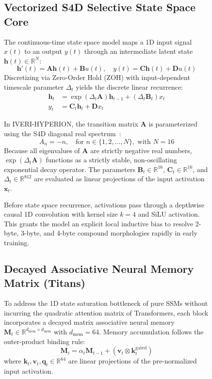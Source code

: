 \documentclass[10pt,twocolumn,letterpaper]{article}
\begin{document}
\begin{figure}[t]
\subsection{Vectorized S4D Selective State Space Core}
The continuous-time state space model maps a 1D input signal $x(t)$ to an output $y(t)$ through an intermediate latent state $\mathbf{h}(t) \in \mathbb{R}^N$:
\begin{equation}
    \mathbf{h}'(t) = \mathbf{A}\mathbf{h}(t) + \mathbf{B}u(t), \quad y(t) = \mathbf{C}\mathbf{h}(t) + \mathbf{D}u(t)
\end{equation}
Discretizing via Zero-Order Hold (ZOH) with input-dependent timescale parameter $\Delta_t$ yields the discrete linear recurrence:
\begin{align}
    \mathbf{h}_t &= \exp(\Delta_t \mathbf{A})\mathbf{h}_{t-1} + (\Delta_t \mathbf{B}_t) x_t \\
    y_t &= \mathbf{C}_t \mathbf{h}_t + \mathbf{D} x_t
\end{align}

In IVERI-HYPERION, the transition matrix $\mathbf{A}$ is parameterized using the S4D diagonal real spectrum~\cite{gu2022s4d}:
\begin{equation}
    A_n = -n, \quad \text{for } n \in \{1, 2, \dots, N\}, \text{ with } N = 16
\end{equation}
Because all eigenvalues of $\mathbf{A}$ are strictly negative real numbers, $\exp(\Delta_t \mathbf{A})$ functions as a strictly stable, non-oscillating exponential decay operator. The parameters $\mathbf{B}_t \in \mathbb{R}^{16}$, $\mathbf{C}_t \in \mathbb{R}^{16}$, and $\Delta_t \in \mathbb{R}^{812}$ are evaluated as linear projections of the input activation $\mathbf{x}_t$.

Before state space recurrence, activations pass through a depthwise causal 1D convolution with kernel size $k = 4$ and SiLU activation. This grants the model an explicit local inductive bias to resolve 2-byte, 3-byte, and 4-byte compound morphologies rapidly in early training.

\subsection{Decayed Associative Neural Memory Matrix (Titans)}
To address the 1D state saturation bottleneck of pure SSMs without incurring the quadratic attention matrix of Transformers, each block incorporates a decayed matrix associative neural memory $\mathbf{M}_t \in \mathbb{R}^{d_{\text{mem}} \times d_{\text{mem}}}$ with $d_{\text{mem}} = 64$. Memory accumulation follows the outer-product binding rule:
\begin{equation}
    \mathbf{M}_t = \alpha_t \mathbf{M}_{t-1} + (\mathbf{v}_t \otimes \mathbf{k}_t^{\text{gated}})
\end{equation}
where $\mathbf{k}_t, \mathbf{v}_t, \mathbf{q}_t \in \mathbb{R}^{64}$ are linear projections of the pre-normalized input activation.


\end{figure}
\end{document}
